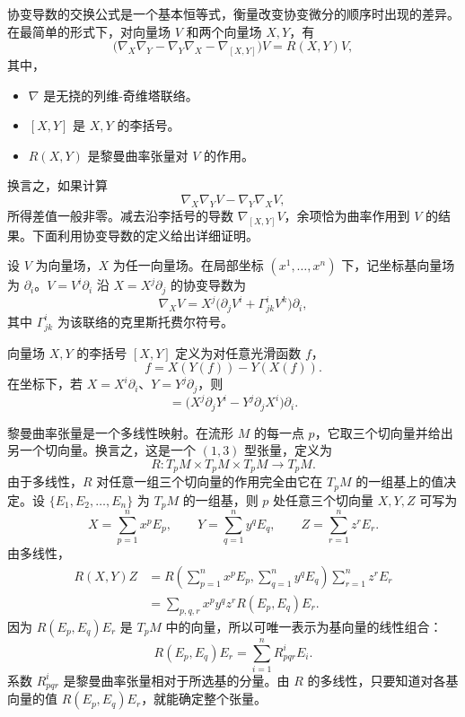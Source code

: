 协变导数的交换公式是一个基本恒等式，衡量改变协变微分的顺序时出现的差异。在最简单的形式下，对向量场 $V$ 和两个向量场 $X,Y$，有
\begin{equation*}
  \bigl(\nabla_X\nabla_Y-\nabla_Y\nabla_X-\nabla_{[X,Y]}\bigr)V
     =R(X,Y)V,
  \tag{5B1}\label{eq:5B1}
\end{equation*}
其中，
\begin{itemize}
  \item $\nabla$ 是无挠的列维-奇维塔联络。
  \item $[X,Y]$ 是 $X,Y$ 的李括号。
  \item $R(X,Y)$ 是黎曼曲率张量对 $V$ 的作用。
\end{itemize}
换言之，如果计算
\[
  \nabla_X\nabla_YV-\nabla_Y\nabla_XV,
\]
所得差值一般非零。减去沿李括号的导数 $\nabla_{[X,Y]}V$，余项恰为曲率作用到 $V$ 的结果。下面利用协变导数的定义给出详细证明。

设 $V$ 为向量场，$X$ 为任一向量场。在局部坐标 $(x^1,\ldots,x^n)$ 下，记坐标基向量场为 $\partial_i$。$V=V^i\partial_i$ 沿 $X=X^j\partial_j$ 的协变导数为
\begin{equation*}
  \nabla_X V=X^j\bigl(\partial_j V^i+\Gamma^i_{jk}V^k\bigr)\partial_i,
  \tag{5B2}\label{eq:5B2}
\end{equation*}
其中 $\Gamma^i_{jk}$ 为该联络的克里斯托费尔符号。

向量场 $X,Y$ 的李括号 $[X,Y]$ 定义为对任意光滑函数 $f$，
\begin{equation*}
  [X,Y]f=X(Y(f))-Y(X(f)).
  \tag{5B3}\label{eq:5B3}
\end{equation*}
在坐标下，若 $X=X^i\partial_i$、$Y=Y^j\partial_j$，则
\begin{equation*}
  [X,Y]=\bigl(X^j\partial_jY^i-Y^j\partial_jX^i\bigr)\partial_i.
  \tag{5B4}\label{eq:5B4}
\end{equation*}

黎曼曲率张量是一个多线性映射。在流形 $M$ 的每一点 $p$，它取三个切向量并给出另一个切向量。换言之，这是一个 $(1,3)$ 型张量，定义为
\[
  R\colon T_pM\times T_pM\times T_pM\longrightarrow T_pM.
\]
由于多线性，$R$ 对任意一组三个切向量的作用完全由它在 $T_pM$ 的一组基上的值决定。设 $\{E_1,E_2,\ldots,E_n\}$ 为 $T_pM$ 的一组基，则 $p$ 处任意三个切向量 $X,Y,Z$ 可写为
\[
  X=\sum_{p=1}^n x^pE_p,\qquad
  Y=\sum_{q=1}^n y^qE_q,\qquad Z=\sum_{r=1}^n z^rE_r.
\]
由多线性，
\[
  \begin{aligned}
    R(X,Y)Z&=R\left(\sum_{p=1}^nx^pE_p,\sum_{q=1}^ny^qE_q\right)
                  \sum_{r=1}^nz^rE_r\\
            &=\sum_{p,q,r}x^py^qz^r R(E_p,E_q)E_r.
  \end{aligned}
\]
因为 $R(E_p,E_q)E_r$ 是 $T_pM$ 中的向量，所以可唯一表示为基向量的线性组合：
\[
  R(E_p,E_q)E_r=\sum_{i=1}^nR^i_{pqr}E_i.
\]
系数 $R^i_{pqr}$ 是黎曼曲率张量相对于所选基的分量。由 $R$ 的多线性，只要知道对各基向量的值 $R(E_p,E_q)E_r$，就能确定整个张量。

